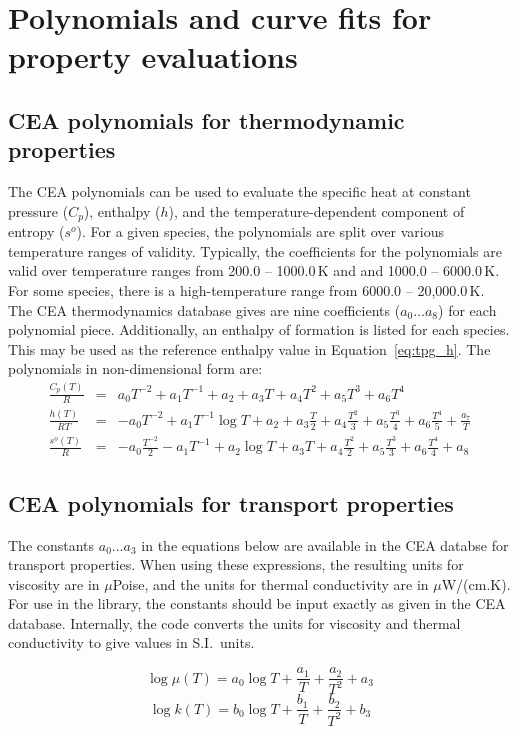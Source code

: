 \chapter{Polynomials and curve fits for property evaluations}
\label{chap:poly}

\section{CEA polynomials for thermodynamic properties}
\label{sec:cea-thermo}
The CEA polynomials can be used to evaluate the specific heat
at constant pressure ($C_p$), enthalpy ($h$), and
the temperature-dependent component of entropy ($s^o$).
For a given species, the polynomials are split over various temperature
ranges of validity.
Typically, the coefficients for the polynomials are valid over temperature ranges
from 200.0 -- 1000.0\,K and and 1000.0 -- 6000.0\,K.
For some species, there is a high-temperature range from 6000.0 -- 20,000.0\,K.
The CEA thermodynamics database gives are nine coefficients ($a_0 \ldots a_8$) for each polynomial piece.
Additionally, an enthalpy of formation is listed for each species.
This may be used as the reference enthalpy value in Equation~\ref{eq:tpg_h}.
The polynomials in non-dimensional form are:
\begin{eqnarray}
 \frac{C_p(T)}{R} & = & a_0 T^{-2} + a_1 T^{-1} + a_2 + a_3 T + a_4 T^2 + a_5 T^3 + a_6 T^4 \\
 \frac{h(T)}{RT} & = & -a_0 T^{-2} + a_1 T^{-1} \log{T} + a_2 + a_3 \frac{T}{2} +
                        a_4 \frac{T^2}{3} + a_5 \frac{T^3}{4} + a_6 \frac{T^4}{5} + \frac{a_7}{T} \\
 \frac{s^o(T)}{R} & = & -a_0 \frac{T^{-2}}{2} - a_1 T^{-1} + a_2 \log{T} + a_3 T + a_4 \frac{T^2}{2}  +
                        a_5 \frac{T^{3}}{3} + a_6 \frac{T^4}{4} + a_8
\end{eqnarray}

\section{CEA polynomials for transport properties}
\label{app:cea-visc}
The constants $a_0 \dots a_3$ in the equations below are
available in the CEA databse for transport properties.
When using these expressions, the resulting units for viscosity
are in $\mu$Poise, and the units for thermal conductivity
are in $\mu$W/(cm.K).
For use in the library, the constants should be input exactly
as given in the CEA database.
Internally, the code converts the units for viscosity and thermal
conductivity to give values in S.I.\ units.

\begin{equation}
\log{\mu(T)}  =  a_0 \log{T} + \frac{a_1}{T} + \frac{a_2}{T^2} + a_3
\end{equation}
\begin{equation}
\log{k(T)} = b_0 \log{T} + \frac{b_1}{T} + \frac{b_2}{T^2} + b_3
\end{equation}

